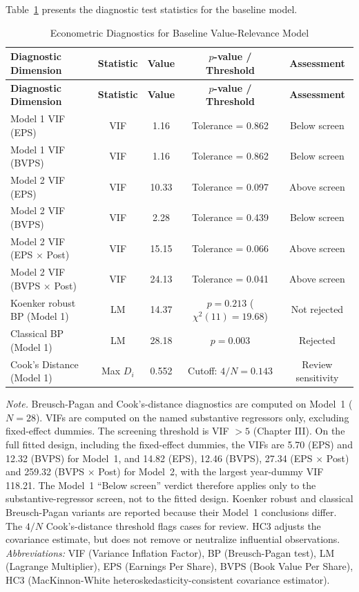 Table~\ref{tab:t6_diagnostics} presents the diagnostic test statistics for the baseline model.

{\small
\begin{longtable}{>{\raggedright\arraybackslash}p{}cccc}
\caption{Econometric Diagnostics for Baseline Value-Relevance Model}
\label{tab:t6_diagnostics}\\
\toprule
\textbf{Diagnostic Dimension} & \textbf{Statistic} & \textbf{Value} & \textbf{$p$-value / Threshold} & \textbf{Assessment} \\
\midrule
\endfirsthead
\textbf{Diagnostic Dimension} & \textbf{Statistic} & \textbf{Value} & \textbf{$p$-value / Threshold} & \textbf{Assessment} \\
\midrule
\endhead
Model 1 VIF (EPS) & VIF & 1.16 & Tolerance = 0.862 & Below screen \\
\addlinespace
Model 1 VIF (BVPS) & VIF & 1.16 & Tolerance = 0.862 & Below screen \\
\addlinespace
Model 2 VIF (EPS) & VIF & 10.33 & Tolerance = 0.097 & Above screen \\
Model 2 VIF (BVPS) & VIF & 2.28 & Tolerance = 0.439 & Below screen \\
Model 2 VIF (EPS $\times$ Post) & VIF & 15.15 & Tolerance = 0.066 & Above screen \\
Model 2 VIF (BVPS $\times$ Post) & VIF & 24.13 & Tolerance = 0.041 & Above screen \\
\addlinespace
Koenker robust BP (Model 1) & LM & 14.37 & $p = 0.213$ ($\chi^2(11) = 19.68$) & Not rejected \\
Classical BP (Model 1) & LM & 28.18 & $p = 0.003$ & Rejected \\
\addlinespace
Cook's Distance (Model 1) & Max $D_i$ & 0.552 & Cutoff: $4/N = 0.143$ & Review sensitivity \\
\bottomrule
\end{longtable}}

\vspace{4pt}
{\footnotesize\noindent
\textit{Note.} Breusch-Pagan and Cook's-distance diagnostics are computed on Model~1 ($N = 28$). VIFs are computed on the named substantive regressors only, excluding fixed-effect dummies. The screening threshold is VIF $> 5$ (Chapter III). On the full fitted design, including the fixed-effect dummies, the VIFs are 5.70 (EPS) and 12.32 (BVPS) for Model~1, and 14.82 (EPS), 12.46 (BVPS), 27.34 (EPS $\times$ Post) and 259.32 (BVPS $\times$ Post) for Model~2, with the largest year-dummy VIF 118.21. The Model~1 ``Below screen'' verdict therefore applies only to the substantive-regressor screen, not to the fitted design. Koenker robust and classical Breusch-Pagan variants are reported because their Model~1 conclusions differ. The $4/N$ Cook's-distance threshold flags cases for review. HC3 adjusts the covariance estimate, but does not remove or neutralize influential observations. \\
\textit{Abbreviations:} VIF (Variance Inflation Factor), BP (Breusch-Pagan test), LM (Lagrange Multiplier), EPS (Earnings Per Share), BVPS (Book Value Per Share), HC3 (MacKinnon-White heteroskedasticity-consistent covariance estimator).
\par}

